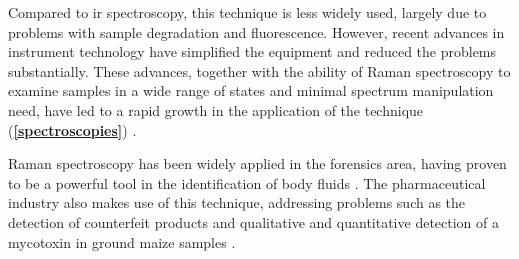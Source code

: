 Compared to \gls{ir} spectroscopy, this technique is less widely used, largely due to problems with sample degradation and fluorescence. However, recent advances in instrument technology have simplified the equipment and reduced the problems substantially. These advances, together with the ability of Raman spectroscopy to examine samples in a wide range of states and minimal spectrum manipulation need, have led to a rapid growth in the application of the technique (\textbf{\autoref{spectroscopies}}) \citep{smith2005modern}.

Raman spectroscopy has been widely applied in the forensics area, having proven to be a powerful tool in the identification of body fluids \citep{virkler2010raman, sikirzhytski2010discriminant, sikirzhytski2012advanced}. The pharmaceutical industry also makes use of this technique, addressing problems such as the detection of counterfeit products \citep{roggo2010identification, sacre2011detection} and qualitative and quantitative detection of a mycotoxin in ground maize samples \citep{lee2013application}.




\setcounter{table}{0} %
\newcommand{\htab}[1]{\textbf{{\footnotesize \textcolor{white}{#1}}}}

